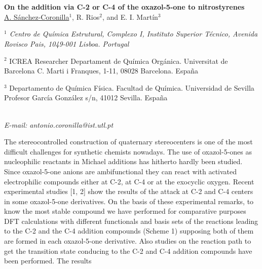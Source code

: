 \newpage
\setcounter{figure}{0}
\section*{}
\begin{center}
{ \bf \Large
On the addition via C-2 or C-4 of the oxazol-5-one to
nitrostyrenes
}
\\
\vspace{0.5cm}
\underline{A. Sánchez-Coronilla}$^{1}$, R. Rios$^{2}$, and E. I. Martín$^{3}$
\\
\vspace{0.5cm}
{\it
$^{1}$ Centro de Química Estrutural, Complexo I, Instituto Superior Técnico, Avenida Rovisco Pais,
1049-001 Lisboa. Portugal

$^{2}$ ICREA Researcher Departament de Química Orgánica. Universitat de Barcelona
C. Marti i Franques, 1-11, 08028 Barcelona. España

$^{3}$ Departamento de Química Física. Facultad de Química. Universidad de Sevilla
Profesor García González s/n, 41012 Sevilla. España
}
\\
\vspace{0.5cm}
{\it E-mail: antonio.coronilla@ist.utl.pt}
\\
\vspace{0.5cm}
\end{center}
The stereocontrolled construction of quaternary stereocenters is one of the
most difficult challenges for synthetic chemists nowadays. The use of oxazol-5-ones
as nucleophilic reactants in Michael additions has hitherto hardly been studied. Since
oxazol-5-one anions are ambifunctional they can react with activated electrophilic
compounds either at C-2, at C-4 or at the exocyclic oxygen. Recent experimental
studies [1, 2] show the results of the attack at C-2 and C-4 centers in some
oxazol-5-one derivatives. On the basis of these experimental remarks, to know the most stable
compound we have performed for comparative purposes DFT calculations with
different functionals and basis sets of the reactions leading to the C-2 and the C-4
addition compounds (Scheme 1) supposing both of them are formed in each oxazol-5-one derivative. Also studies on the reaction path to get the transition state
conducing to the C-2 and C-4 addition compounds have been performed. The results
